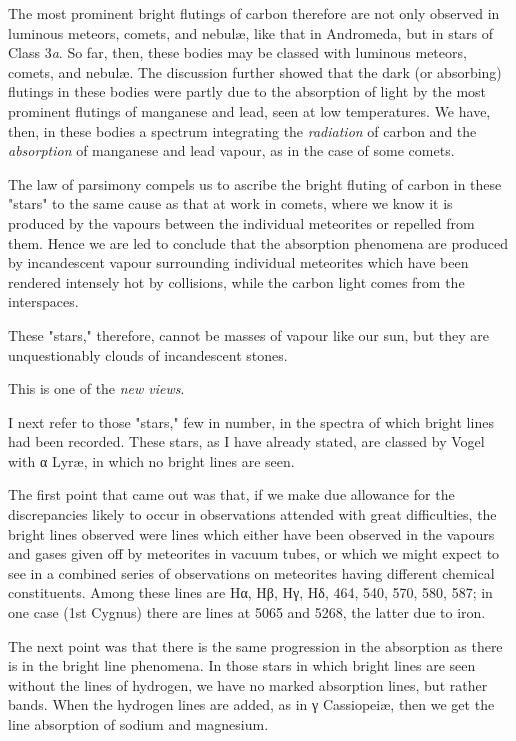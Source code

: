 \documentclass[a4paper, 12pt, oneside, polutonikogreek, english]{article}
\begin{document}
The most prominent bright flutings of carbon therefore are not only observed in luminous meteors, comets, and nebulæ, like that in Andromeda, but in stars of Class 3\emph{a}. So far, then, these bodies may be classed with luminous meteors, comets, and nebulæ. The discussion further showed that the dark (or absorbing) flutings in these bodies were partly due to the absorption of light by the most prominent flutings of manganese and lead, seen at low temperatures. We have, then, in these bodies a spectrum integrating the \emph{radiation} of carbon and the \emph{absorption} of manganese and lead vapour, as in the case of some comets.

The law of parsimony compels us to ascribe the bright fluting of carbon in these "stars" to the same cause as that at work in comets, where we know it is produced by the vapours between the individual meteorites or repelled from them. Hence we are led to conclude that the absorption phenomena are produced by incandescent vapour surrounding individual meteorites which have been rendered intensely hot by collisions, while the carbon light comes from the interspaces.

These "stars," therefore, cannot be masses of vapour like our sun, but they are unquestionably clouds of incandescent stones.

This is one of the \emph{new views}.

I next refer to those "stars," few in number, in the spectra of which bright lines had been recorded. These stars, as I have already stated, are classed by Vogel with α Lyræ, in which no bright lines are seen.

The first point that came out was that, if we make due allowance for the discrepancies likely to occur in observations attended with great difficulties, the bright lines observed were lines which either have been observed in the vapours and gases given off by meteorites in vacuum tubes, or which we might expect to see in a combined series of observations on meteorites having different chemical constituents. Among these lines are Hα, Hβ, Hγ, Hδ, 464, 540, 570, 580, 587; in one case (1st Cygnus) there are lines at 5065 and 5268, the latter due to iron.

The next point was that there is the same progression in the absorption as there is in the bright line phenomena. In those stars in which bright lines are seen without the lines of hydrogen, we have no marked absorption lines, but rather bands. When the hydrogen lines are added, as in γ Cassiopeiæ, then we get the line absorption of sodium and magnesium.
\end{document}
